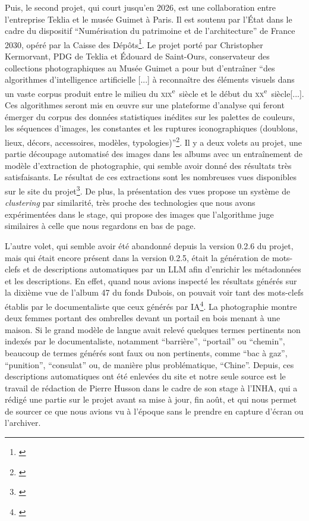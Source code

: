 Puis, le second projet, qui court jusqu'en 2026, est une collaboration entre l'entreprise Teklia et le musée Guimet à Paris. Il est soutenu par l’État dans le cadre du dispositif \enquote{Numérisation du patrimoine et de l’architecture} de France 2030, opéré par la Caisse des Dépôts\footnote{\cite{noauthor_projet_nodate}}. Le projet porté par Christopher Kermorvant, PDG de Teklia et Édouard de Saint-Ours, conservateur des collections photographiques au Musée Guimet a pour but d'entraîner \enquote{des algorithmes d’intelligence artificielle [...] à reconnaître des éléments visuels dans un vaste corpus produit entre le milieu du \textsc{xix}\textsuperscript{e}~siècle et le début du \textsc{xx}\textsuperscript{e}~siècle[...]. Ces algorithmes seront mis en œuvre sur une plateforme d’analyse qui feront émerger du corpus des données statistiques inédites sur les palettes de couleurs, les séquences d’images, les constantes et les ruptures iconographiques (doublons, lieux, décors, accessoires, modèles, typologies)}\footnote{\cite{noauthor_projet_nodate}}. Il y a deux volets au projet, une partie découpage automatisé des images dans les albums avec un entraînement de modèle d'extraction de photographie, qui semble avoir donné des résultats très satisfaisants. Le résultat de ces extractions sont les nombreuses vues disponibles sur le site du projet\footnote{\cite{noauthor_hikaria_nodate-1}}. De plus, la présentation des vues propose un système de \textit{clustering} par similarité, très proche des technologies que nous avons expérimentées dans le stage, qui propose des images que l'algorithme juge similaires à celle que nous regardons en bas de page.

L'autre volet, qui semble avoir été abandonné depuis la version 0.2.6 du projet, mais qui était encore présent dans la version 0.2.5, était la génération de mots-clefs et de descriptions automatiques par un LLM afin d'enrichir les métadonnées et les descriptions. En effet, quand nous avions inspecté les résultats générés sur la dixième vue de l'album 47 du fonds Dubois, on pouvait voir tant des mots-clefs établis par le documentaliste que ceux générés par IA\footnote{\cite{noauthor_hikaria_nodate}}. La photographie montre deux femmes portant des ombrelles devant un portail en bois menant à une maison. Si le grand modèle de langue avait relevé quelques termes pertinents non indexés par le documentaliste, notamment \enquote{barrière}, \enquote{portail} ou \enquote{chemin}, beaucoup de termes générés sont faux ou non pertinents, comme \enquote{bac à gaz}, \enquote{punition}, \enquote{consulat} ou, de manière plus problématique, \enquote{Chine}. Depuis, ces descriptions automatiques ont été enlevées du site et notre seule source est le travail de rédaction de Pierre Husson dans le cadre de son stage à l'INHA, qui a rédigé une partie sur le projet avant sa mise à jour, fin août, et qui nous permet de sourcer ce que nous avions vu à l'époque sans le prendre en capture d'écran ou l'archiver. 

